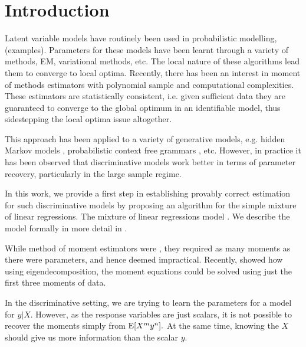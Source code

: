 \section{Introduction}
\label{sec:intro}


Latent variable models have routinely been used in probabilistic
modelling, (examples). Parameters for these models have been learnt
through a variety of methods, EM, variational methods, etc. The local
nature of these algorithms lead them to converge to local optima.
Recently, there has been an interest in moment of methods estimators
with polynomial sample and computational complexities. These estimators
are statistically consistent, i.e. given sufficient data they are
guaranteed to converge to the global optimum in an identifiable model,
thus sidestepping the local optima issue altogether.

This approach has been applied to a variety of generative models, e.g.
hidden Markov models \cite{AnandkumarHsuKakade2012}, probabilistic
context free grammars \cite{HsuKakadeLiang2012}, etc. However, in
practice it has been observed that discriminative models work better in
terms of parameter recovery\citationneeded, particularly in the large
sample regime. 

In this work, we provide a first step in establishing provably correct
estimation for such discriminative models by proposing an algorithm for
the simple mixture of linear regressions. The mixture of linear
regressions model . We describe the model formally in more
detail in .

While method of moment estimators were ,
they required as many moments as there were parameters, and hence deemed
impractical. Recently, \citet{AnandkumarHsuKakade2012} showed how using
eigendecomposition, the moment equations could be solved using just the
first three moments of data.

In the discriminative setting, we are trying to learn the parameters for
a model for $y | X$. However, as the response variables are just
scalars, it is not possible to recover the moments simply from $\operatorname{E}[ X^m
y^n ].$ At the same time, knowing the $X$ should give us more
information than the scalar $y$.

